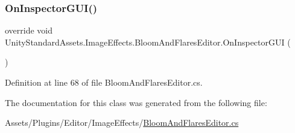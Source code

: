 \subsubsection{\texorpdfstring{On\+Inspector\+G\+U\+I()}{OnInspectorGUI()}}
{\footnotesize\ttfamily override void Unity\+Standard\+Assets.\+Image\+Effects.\+Bloom\+And\+Flares\+Editor.\+On\+Inspector\+G\+UI (\begin{DoxyParamCaption}{ }\end{DoxyParamCaption})}



Definition at line 68 of file Bloom\+And\+Flares\+Editor.\+cs.



The documentation for this class was generated from the following file\+:\begin{DoxyCompactItemize}
\item 
Assets/\+Plugins/\+Editor/\+Image\+Effects/\mbox{\hyperlink{_bloom_and_flares_editor_8cs}{Bloom\+And\+Flares\+Editor.\+cs}}\end{DoxyCompactItemize}

